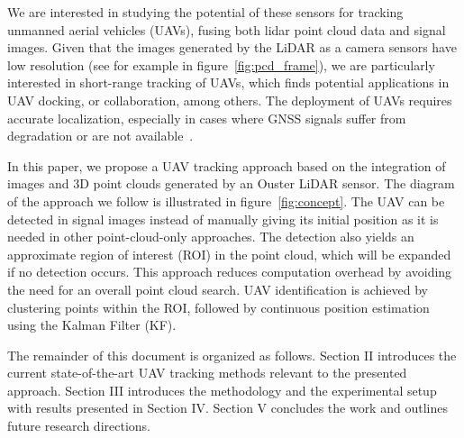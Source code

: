 We are interested in studying the potential of these sensors for tracking unmanned aerial vehicles (UAVs), fusing both lidar point cloud data and signal images. Given that the images generated by the LiDAR as a camera sensors have low resolution (see for example in figure~\ref{fig:pcd_frame}), we are particularly interested in short-range tracking of UAVs, which finds potential applications in UAV docking, or collaboration, among others. The deployment of UAVs requires accurate localization, especially in cases where GNSS signals suffer from degradation or are not available~\cite{li2018high}. 

In this paper, we propose a UAV tracking approach based on the integration of images and 3D point clouds generated by an Ouster LiDAR sensor. The diagram of the approach we follow is illustrated in figure~\ref{fig:concept}. The UAV can be detected in signal images instead of manually giving its initial position as it is needed in other point-cloud-only approaches. The detection also yields an approximate region of interest (ROI) in the point cloud, which will be expanded if no detection occurs. This approach reduces computation overhead by avoiding the need for an overall point cloud search. UAV identification is achieved by clustering points within the ROI, followed by continuous position estimation using the Kalman Filter (KF).

The remainder of this document is organized as follows. Section II introduces the current state-of-the-art UAV tracking methods relevant to the presented approach. Section III  introduces the methodology and the experimental setup with results presented in Section IV. Section V concludes the work and outlines future research directions.





